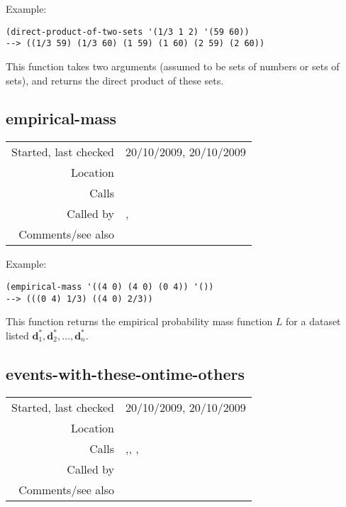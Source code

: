 \vspace{0.5cm}
\noindent Example:
\begin{verbatim}
(direct-product-of-two-sets '(1/3 1 2) '(59 60))
--> ((1/3 59) (1/3 60) (1 59) (1 60) (2 59) (2 60))
\end{verbatim}

\noindent This function takes two arguments (assumed
to be sets of numbers or sets of sets), and returns
the direct product of these sets.


\subsection*{empirical-mass}\label{fun:empirical-mass}

\vspace{0.3cm}
\begin{tabular}{r|p{8cm}}
Started, last checked & 20/10/2009, 20/10/2009 \\
Location & \nameref{sec:empirical-preliminaries} \\
Calls & \nameref{fun:present-to-mass} \\
Called by & \nameref{fun:likelihood-of-pattern-or-translation}, \nameref{fun:likelihood-of-translations-geometric-mean} \\
Comments/see also &
\end{tabular}

\vspace{0.5cm}
\noindent Example:
\begin{verbatim}
(empirical-mass '((4 0) (4 0) (0 4)) '())
--> (((0 4) 1/3) ((4 0) 2/3))
\end{verbatim}

\noindent This function returns the empirical
probability mass function $L$ for a dataset listed
$\mathbf{d}_1^\ast, \mathbf{d}_2^\ast,\ldots,
\mathbf{d}_n^\ast$.


\subsection*{events-with-these-ontime-others}\label{fun:events-with-these-ontime-others}

\vspace{0.3cm}
\begin{tabular}{r|p{8cm}}
Started, last checked & 20/10/2009, 20/10/2009 \\
Location & \nameref{sec:empirical-preliminaries} \\
Calls & \nameref{fun:events-with-this-ontime-other},\newline \nameref{fun:index-1st-sublist-item>=}, \nameref{fun:nth-list-of-lists},\newline \nameref{fun:my-last} \\
Called by & \\
Comments/see also &
\end{tabular}

